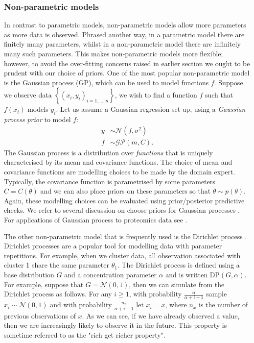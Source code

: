 \documentclass[12pt,english, journal=jpr, layout=twocolumn]{article}
\begin{document}
\subsubsection{Non-parametric models}
In contrast to parametric models, non-parametric models allow more parameters as more data is observed. Phrased another way, in a parametric model there are finitely many parameters, whilst in a non-parametric model there are infinitely many such parameters. This makes non-parametric models more flexible; however, to avoid the over-fitting concerns raised in earlier section we ought to be prudent with our choice of priors. One of the most popular non-parametric model is the Gaussian process (GP), which can be used to model functions $f$. Suppose we observe data $\left\{(x_i,y_i)_{i = 1,...,n}\right\}$, we wish to find a function $f$ such that $f(x_i)$ models $y_i$. Let us assume a Gaussian regression set-up, using a \textit{Gaussian process prior} to model $f$:
\begin{equation}
\begin{split}
y &\sim \mathcal{N}(f, \sigma^2)\\
f &\sim \mathcal{GP}(m, C).
\end{split}
\end{equation}
The Gaussian process is a distribution over \textit{functions} that is uniquely characterised by its mean and covariance functions. The choice of mean and covariance functions are modelling choices to be made by the domain expert. Typically, the covariance function is parametrised by some parameters $C = C(\theta)$ and we can also place priors on these parameters so that $\theta \sim p(\theta)$. Again, these modelling choices can be evaluated using prior/posterior predictive checks. We refer to several discussion on choose priors for Gaussian processes \citep{Berger::2001,Paulo::2005, De::2007, Van::2009, Fuglstad::2019}. For applications of Gaussian process to proteomics data see \citet{Maboudi::2017,Crook::2019b, Shin::2020, Fang::2021}.

The other non-parametric model that is frequently used is the Dirichlet process \citep{Ferguson::1973, Antoniak::1974}. Dirichlet processes are a popular tool for modelling data with parameter repetitions. For example, when we cluster data, all observation associated with cluster 1 share the same parameter $\theta_1$. The Dirichlet process is defined using a base distribution $G$ and a concentration parameter $\alpha$ and is written $\text{DP}(G, \alpha)$. For example, suppose that $G = \mathcal{N}(0, 1)$, then we can simulate from the Dirichlet process as follows. For any $i \geq 1$, with probability $\frac{\alpha}{\alpha + i - 1}$ sample $x_i \sim \mathcal{N}(0, 1)$ and with probability $\frac{n_x}{\alpha + i - 1}$  let $x_i = x$, where $n_x$ is the number of previous observations of $x$. As we can see, if we have already observed a value, then we are increasingly likely to observe it in the future. This property is sometime referred to as the "rich get richer property".
\end{document}
